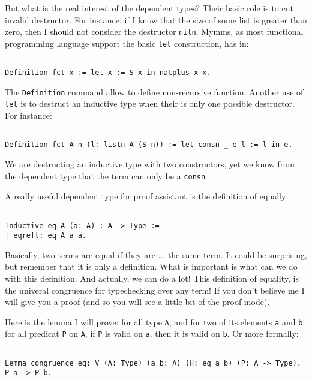 \documentclass[a4paper,5pt,onecolumn]{article}
\begin{document}
But what is the real interest of the dependent types? Their basic role
is to cut invalid destructor. For instance, if I know that the size of
some list is greater than zero, then I should not consider the
destructor \texttt{niln}. Mymms, as most functional programming
language support the basic \texttt{let} construction, has in:

\begin{verbatim}

Definition fct x := let x := S x in natplus x x.

\end{verbatim}

The \texttt{Definition} command allow to define non-recursive
function. Another use of \texttt{let} is to destruct an inductive type
when their is only one possible destructor. For instance:

\begin{verbatim}

Definition fct A n (l: listn A (S n)) := let consn _ e l := l in e.

\end{verbatim}

We are destructing an inductive type with two constructors, yet we
know from the dependent type that the term can only be a
\texttt{consn}.

A really useful dependent type for proof assistant is the definition
of equally:

\begin{verbatim}

Inductive eq A (a: A) : A -> Type :=
| eqrefl: eq A a a.

\end{verbatim}

Basically, two terms are equal if they are ... the same term. It could
be surprising, but remember that it is only a definition. What is
important is what can we do with this definition. And actually, we can
do a lot! This definition of equality, is the univeral congruence for
typechecking over any term! If you don't believe me I will give you a
proof (and so you will see a little bit of the proof mode).

Here is the lemma I will prove: for all type \texttt{A}, and for two
of its elements \texttt{a} and \texttt{b}, for all predicat \texttt{P}
on \texttt{A}, if \texttt{P} is valid on \texttt{a}, then it is valid
on \texttt{b}. Or more formally:

\begin{verbatim}

Lemma congruence_eq: V (A: Type) (a b: A) (H: eq a b) (P: A -> Type). P a -> P b.

\end{verbatim}
\end{document}
